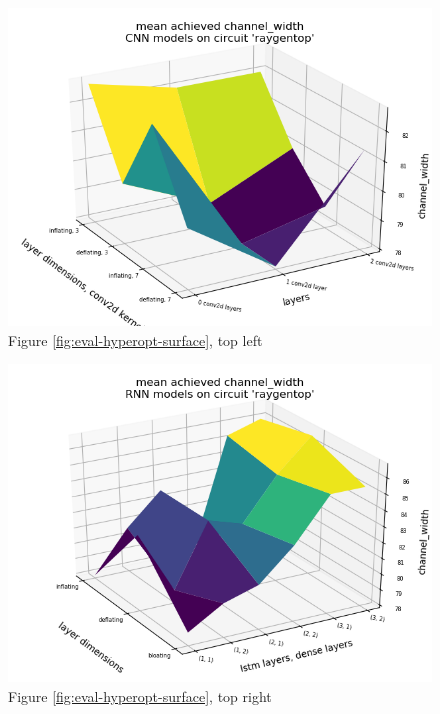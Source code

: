 \begin{figure}[H]
	\includegraphics[width=\linewidth]{plots/cnn-hyperopt-chan-width.png}
	\caption{Figure \ref{fig:eval-hyperopt-surface}, top left}
\end{figure}

\begin{figure}[H]
	\includegraphics[width=\linewidth]{plots/rnn-hyperopt-chan-width.png}
	\caption{Figure \ref{fig:eval-hyperopt-surface}, top right}
\end{figure}

